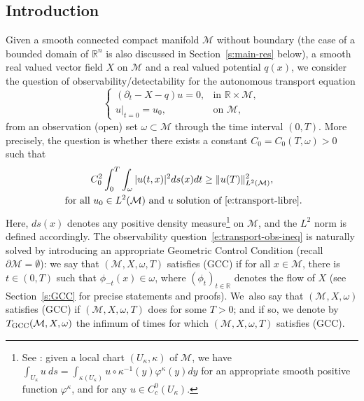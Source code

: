 \documentclass[JEP,XML,SOM,Unicode]{cedram}
\newcommand{\GCC}{\textup{GCC}}
\newcommand{\pGCC}{\textup{(GCC)}\xspace}
\theoremstyle{definition}
\newcommand{\M}{\ensuremath{\mathcal M}}
\newcommand{\mb}[1]{\ensuremath{\mathbb{#1}}}
\newcommand{\R}{{\mb{R}}}
\let\d\partial
\let\q q
\begin{document}
\subsection{Introduction}
\label{s:intro-intro}
Given a smooth connected compact manifold $\M$ without boundary (the case of a bounded domain of $\R^n$ is also discussed in Section~\ref{s:main-res} below), a smooth real valued vector field $X$ on $\M$ and a real valued potential $\q(x)$, we consider the question of observability/detectability for the autonomous transport equation
\begin{equation}
\label{e:transport-libre}
\begin{cases}
(\d_t - X-\q) u = 0, & \text{in } \R\times \M, \\
u|_{t=0} = u_0, & \text{on } \M,
\end{cases}
\end{equation}
from an observation (open) set $\omega \subset \M$ through the time interval $(0,T)$. More precisely, the question is whether there exists a constant $C_0=C_0(T,\omega)>0$ such that
\begin{multline}
\label{e:transport-obs-ineq}
C_0^2 \int_0^T\int_\omega |u(t,x)|^2 ds(x)dt \geq \|u (T)\|_{L^2(\M)}^2, \\
\text{ for all } u_0 \in L^2(\M) \text{ and } u \text{ solution of~\eqref{e:transport-libre}}.
\end{multline}
Here, $ds(x)$ denotes any positive density measure\footnote{See \eg \cite[Chap.\,16 p.\,427]{Lee:book}: given a local chart $(U_\kappa, \kappa)$ of $\M$, we have $\int_{U_\kappa} u \ ds= \int_{\kappa(U_\kappa)} u\circ \kappa^{-1}(y) \varphi^\kappa(y) dy$ for an appropriate smooth positive function $\varphi^\kappa$, and for any $u \in C^0_c(U_\kappa)$.} on $\M$, and the $L^2$ norm is defined accordingly.
The observability question~\eqref{e:transport-obs-ineq} is naturally solved by introducing an appropriate Geometric Control Condition (recall $\d\M=\emptyset$): we say that $(\M,X,\omega,T)$ satisfies \pGCC if for all $x\in \M$, there is $t \in (0,T)$ such that $\phi_{-t}(x)\in \omega$, where $(\phi_t)_{t\in\R}$ denotes the flow of $X$ (see Section~\ref{s:GCC} for precise statements and proofs). We~also say that $(\M,X,\omega)$ satisfies \pGCC if $(\M,X,\omega,T)$ does for some $T>0$; and if so, we denote by $T_{\GCC}(\M,X,\omega)$ the infimum of times for which $(\M,X,\omega,T)$ satisfies \pGCC.
\end{document}
